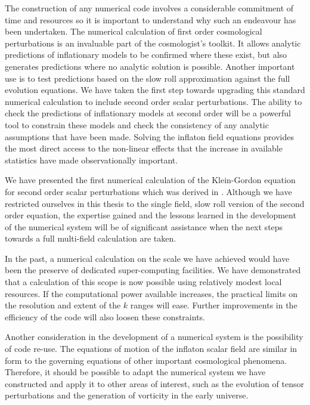 The construction of any numerical code involves a considerable commitment of time
and resources so it is important to understand why such an endeavour has been
undertaken. 
The numerical calculation of first order cosmological perturbations is an invaluable
part of the cosmologist's toolkit. It allows analytic predictions of inflationary
models to be confirmed where these exist, but also generates predictions where no
analytic solution is possible. Another important use is to test predictions based
on the slow roll approximation  against the full evolution equations. 
% 
We have taken the first step towards upgrading this standard numerical calculation to
include second order scalar perturbations. 
% 
The ability to check the predictions of inflationary models at second order will
be a powerful tool to constrain these models and check the consistency of any
analytic assumptions that have been made. Solving the inflaton field equations
provides the most direct access to the non-linear effects that the increase in
available statistics have made observationally important.
% 

We have presented the
first numerical calculation of the Klein-Gordon equation for second order scalar
perturbations which was derived in . Although we have restricted
ourselves in this thesis to the single field, slow roll version of the second order
equation,
the expertise gained and the lessons learned in the development of the numerical
system will be of significant assistance when the next steps towards a full
multi-field calculation are taken. 
% 


In the past, a numerical calculation on the scale we have achieved would have been
the preserve of dedicated super-computing facilities. We have demonstrated that a
calculation of this scope is now possible using relatively modest local resources.
If the computational power available increases, the practical limits on the
resolution and extent of the $k$ ranges will ease. Further improvements in the
efficiency of the code will also loosen these constraints.
% 

Another consideration in the development of a numerical system is the possibility of
code re-use.
The equations of motion of the inflaton scalar field are similar in form
to the governing equations of other important cosmological phenomena. Therefore, it
should be possible to adapt the numerical system we have constructed and apply it to
other areas of interest, such as the evolution of tensor perturbations and the
generation of vorticity in the early universe. 


